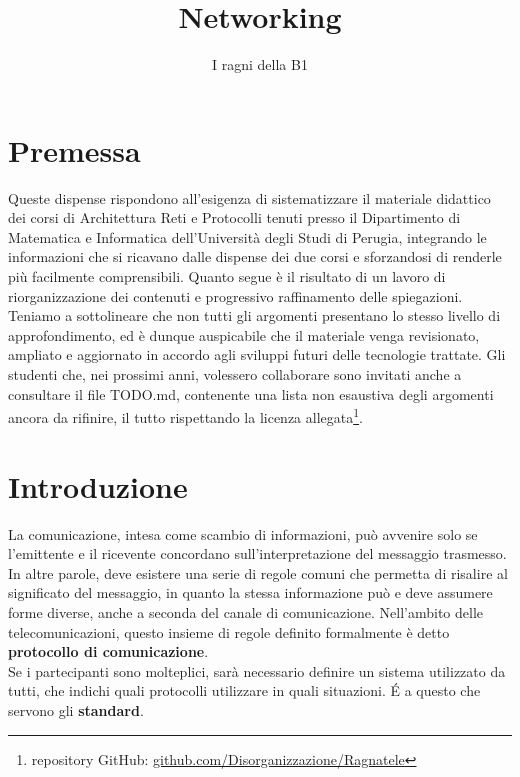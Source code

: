 \documentclass[a4paper, twoside]{article}
\title{Networking}
\author{I ragni della B1}
\begin{document}
\maketitle
\newpage
\tableofcontents
\newpage
\section*{Premessa}
Queste dispense rispondono all'esigenza di sistematizzare il materiale didattico dei corsi di Architettura Reti e Protocolli 
tenuti presso il Dipartimento di Matematica e Informatica dell'Università degli Studi di Perugia, integrando le 
informazioni che si ricavano dalle dispense dei due corsi e sforzandosi di renderle più facilmente comprensibili. Quanto segue è 
il risultato di un lavoro di riorganizzazione dei contenuti e progressivo raffinamento delle spiegazioni. Teniamo a 
sottolineare che non tutti gli argomenti presentano lo stesso livello di approfondimento, ed è dunque auspicabile che il 
materiale venga revisionato, ampliato e aggiornato in accordo agli sviluppi futuri delle tecnologie trattate. Gli studenti che, 
nei prossimi anni, volessero collaborare sono invitati anche a consultare il file TODO.md, contenente una lista non esaustiva 
degli argomenti ancora da rifinire, il tutto rispettando la licenza allegata\footnote{repository GitHub: \url{github.com/Disorganizzazione/Ragnatele}}.
\newpage
\section{Introduzione}
La comunicazione, intesa come scambio di informazioni, può avvenire solo se l'emittente e il ricevente concordano sull'interpretazione del messaggio trasmesso. In altre parole, deve esistere una serie di regole comuni che permetta di risalire al significato del messaggio, in quanto la stessa informazione può e deve assumere forme diverse, anche a seconda del canale di comunicazione.
Nell'ambito delle telecomunicazioni, questo insieme di regole definito formalmente è detto \textbf{protocollo di comunicazione}. \\Se i partecipanti sono molteplici, sarà necessario definire un sistema utilizzato da tutti, che indichi quali protocolli utilizzare in quali situazioni. \'E a questo che servono gli \textbf{standard}.
\end{document}
